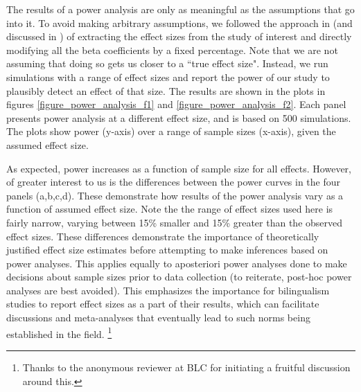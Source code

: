 \documentclass[12 pt]{article}
\begin{document}
The results of a power analysis are only as meaningful as the assumptions that go into it. To avoid making arbitrary assumptions, we followed the approach in \cite{brysbaert2018power} (and discussed in \cite{kumle2021estimating}) of extracting the effect sizes from the study of interest and directly modifying all the beta coefficients by a fixed percentage. Note that we are not assuming that doing so gets us closer to a ``true effect size". Instead, we run simulations with a range of effect sizes and report the power of our study to plausibly detect an effect of that size. The results are shown in the plots in figures \ref{figure_power_analysis_f1} and \ref{figure_power_analysis_f2}. Each panel presents power analysis at a different effect size, and is based on 500 simulations. The plots show power (y-axis) over a range of sample sizes (x-axis), given the assumed effect size.   

As expected, power increases as a function of sample size for all effects. However, of greater interest to us is the differences between the power curves in the four panels (a,b,c,d). These demonstrate how results of the power analysis vary as a function of assumed effect size. Note the the range of effect sizes used here is fairly narrow, varying between 15\% smaller and 15\% greater than the observed effect sizes. These differences demonstrate the importance of theoretically justified effect size estimates before attempting to make inferences based on power analyses. This applies equally to aposteriori power analyses done to make decisions about sample sizes prior to data collection (to reiterate, post-hoc power analyses are best avoided). This emphasizes the importance for bilingualism studies to report effect sizes as a part of their results, which can facilitate discussions and meta-analyses that eventually lead to such norms being established in the field. \footnote{Thanks to the anonymous reviewer at BLC for initiating a fruitful discussion around this.}
\end{document}
